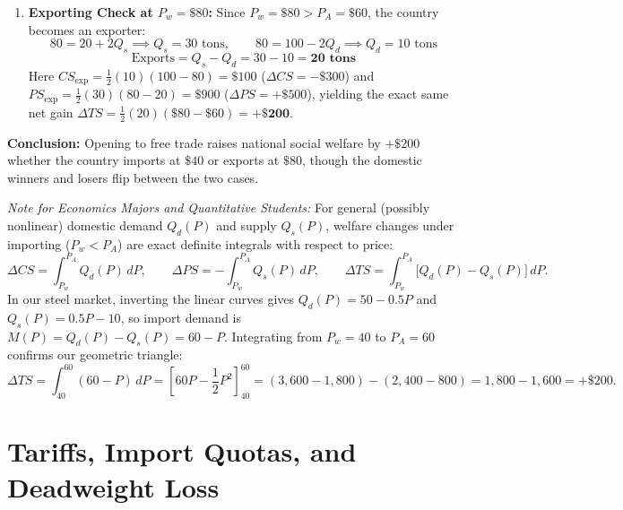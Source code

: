 \documentclass[11pt,letterpaper]{article}
\begin{document}
\begin{tcolorbox}[colback=LightSlate,colframe=CourseBlue,title=\textbf{Work It Out 14.1: Free Trade Surplus in a Small Steel Market}]
\begin{enumerate}
    \item \textbf{Exporting Check at $P_w = \$80$:}
    Since $P_w = \$80 > P_A = \$60$, the country becomes an exporter:
    \[
    80 = 20 + 2Q_s \implies Q_s = 30\text{ tons}, \qquad 80 = 100 - 2Q_d \implies Q_d = 10\text{ tons}
    \]
    \[
    \text{Exports} = Q_s - Q_d = 30 - 10 = \mathbf{20\text{ tons}}
    \]
    Here $CS_{\text{exp}} = \frac{1}{2}(10)(100 - 80) = \$100$ ($\Delta CS = -\$300$) and $PS_{\text{exp}} = \frac{1}{2}(30)(80 - 20) = \$900$ ($\Delta PS = +\$500$), yielding the exact same net gain $\Delta TS = \frac{1}{2}(20)(\$80 - \$60) = \mathbf{+\$200}$.
\end{enumerate}
\textbf{Conclusion:} Opening to free trade raises national social welfare by $+\$200$ whether the country imports at $\$40$ or exports at $\$80$, though the domestic winners and losers flip between the two cases.
\end{tcolorbox}

\begin{tcolorbox}[colback=SlateBlue!5!white,colframe=SlateBlue,title=\textbf{Optional Advanced Calculus Extension: Integral Form of Gains from Trade}]
\small
\emph{Note for Economics Majors and Quantitative Students:}
For general (possibly nonlinear) domestic demand $Q_d(P)$ and supply $Q_s(P)$, welfare changes under importing ($P_w < P_A$) are exact definite integrals with respect to price:
\[
\Delta CS = \int_{P_w}^{P_A} Q_d(P)\,dP, \qquad \Delta PS = -\int_{P_w}^{P_A} Q_s(P)\,dP, \qquad \Delta TS = \int_{P_w}^{P_A} \bigl[Q_d(P) - Q_s(P)\bigr]\,dP.
\]
In our steel market, inverting the linear curves gives $Q_d(P) = 50 - 0.5P$ and $Q_s(P) = 0.5P - 10$, so import demand is $M(P) = Q_d(P) - Q_s(P) = 60 - P$. Integrating from $P_w = 40$ to $P_A = 60$ confirms our geometric triangle:
\[
\Delta TS = \int_{40}^{60} (60 - P)\,dP = \left[60P - \frac{1}{2}P^2\right]_{40}^{60} = (3{,}600 - 1{,}800) - (2{,}400 - 800) = 1{,}800 - 1{,}600 = +\$200.
\]
\end{tcolorbox}

\section{Tariffs, Import Quotas, and Deadweight Loss}
\end{document}
